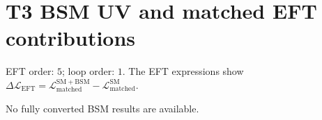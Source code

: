 \documentclass[10pt]{article}
\begin{document}
\section*{T3 BSM UV and matched EFT contributions}
EFT order: $5$; loop order: $1$.
The EFT expressions show $\Delta\mathcal{L}_{\mathrm{EFT}}=\mathcal{L}_{\mathrm{matched}}^{\mathrm{SM+BSM}}-\mathcal{L}_{\mathrm{matched}}^{\mathrm{SM}}$.
\begin{landscape}
\footnotesize
No fully converted BSM results are available.
\end{landscape}
\end{document}
